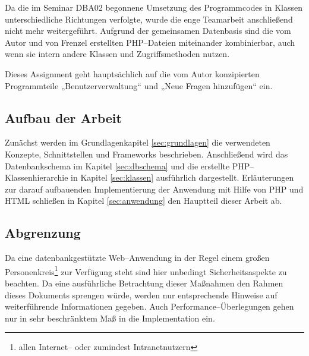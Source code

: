 Da die im Seminar DBA02 begonnene Umsetzung des Programmcodes in Klassen unterschiedliche Richtungen verfolgte, wurde die enge Teamarbeit anschließend nicht mehr weitergeführt. Aufgrund der gemeinsamen Datenbasis sind die vom Autor und von Frenzel erstellten PHP--Dateien miteinander kombinierbar, auch wenn sie intern andere Klassen und Zugriffsmethoden nutzen.

Dieses Assignment geht hauptsächlich auf die vom Autor konzipierten Programmteile „Benutzerverwaltung“ und „Neue Fragen hinzufügen“ ein.

\subsection{Aufbau der Arbeit}

Zunächst werden im Grundlagenkapitel \ref{sec:grundlagen} die verwendeten Konzepte, Schnittstellen und Frameworks beschrieben. Anschließend wird das Datenbankschema im Kapitel \ref{sec:dbschema} und die erstellte PHP--Klassenhierarchie in Kapitel \ref{sec:klassen} ausführlich dargestellt. Erläuterungen zur darauf aufbauenden Implementierung der Anwendung mit Hilfe von PHP und HTML schließen in Kapitel \ref{sec:anwendung} den Hauptteil dieser Arbeit ab.

\subsection{Abgrenzung}

Da eine datenbankgestützte Web--Anwendung in der Regel einem großen Personenkreis\footnote{allen Internet-- oder zumindest Intranetnutzern} zur Verfügung steht sind hier unbedingt Sicherheitsaspekte zu beachten. Da eine ausführliche Betrachtung dieser Maßnahmen den Rahmen dieses Dokuments sprengen würde, werden nur entsprechende Hinweise auf weiterführende Informationen gegeben. Auch Performance--Überlegungen gehen nur in sehr beschränktem Maß in die Implementation ein.
